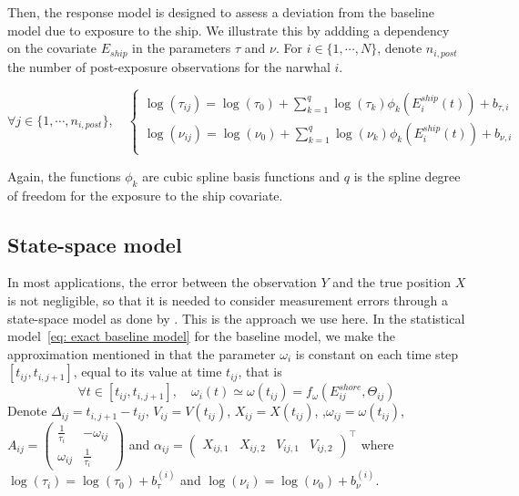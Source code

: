 \documentclass[11pt]{article}
\newcommand {\1}{\mathbb{1}}
\theoremstyle{definition}
\theoremstyle{remark}
\theoremstyle{remark}
\begin{document}
Then, the response model is designed to assess a deviation from the baseline model due to exposure to the ship. We illustrate this by addding a dependency on the covariate $E_{ship}$ in the parameters $\tau$ and $\nu$. 
For $i \in \{1, \cdots, N\}$, denote $n_{i,post}$ the number of post-exposure observations for the narwhal $i$.

\begin{equation}  \forall j \in \{1,\cdots,n_{i,post}\}, \quad \left\{
	\begin{array}{l}
		\log(\tau_{ij})=\log(\tau_{0}) +\sum_{k=1}^{q} \log(\tau_{k})\phi_{k}(E^{ship}_i(t))+b_{\tau,i} \\
		\log(\nu_{ij})=\log(\nu_{0}) +  \sum_{k=1}^{q} \log(\nu_{k}) \phi_{k}(E^{ship}_i(t)) +b_{\nu,i}  \\
	\end{array}
	\right.
	\label{eq: exact response model}
\end{equation}


Again, the functions $\phi_k$ are cubic spline basis functions and $q$ is the spline degree of freedom for the exposure to the ship covariate.






\subsection{State-space model}
\label{section: state space model}
In most applications, the error between the observation $Y$ and the true position $X$ is not negligible, so that it is needed to consider measurement errors through a state-space model as done by \cite{johnson_continuoustime_2008}. This is the approach we use here. In the statistical model~\ref{eq: exact baseline model} for the baseline model, we make the approximation mentioned in \cite{michelot_varying-coefficient_2021} that the parameter $\omega_i$ is constant on each time step $[t_{ij},t_{i,j+1}]$, equal to its value at time $t_{ij}$, that is 
\[\forall t \in [t_{ij},t_{i,j+1}], \quad \omega_{i}(t) \simeq \omega(t_{ij})= f_{\omega}(E^{shore}_{ij},\Theta_{ij})\]
 Denote $\Delta_{ij}=t_{i,j+1}-t_{ij}$, $V_{ij}=V(t_{ij})$, $X_{ij}=X(t_{ij})$, ,$\omega_{ij}=\omega(t_{ij})$, $A_{ij}=\begin{pmatrix} 
	\frac{1}{\tau_{i}} & -\omega_{ij} \\
	\omega_{ij} & \frac{1}{\tau_{i}}
\end{pmatrix}$ and $\alpha_{ij}=\begin{pmatrix} X_{ij,1}  & X_{ij,2} & V_{ij,1} & V_{ij,2}\end{pmatrix}^\top$ where $\log(\tau_i)=\log(\tau_0)+b_{\tau}^{(i)}$ and $\log(\nu_i)=\log(\nu_0)+b_{\nu}^{(i)}$.
\end{document}
